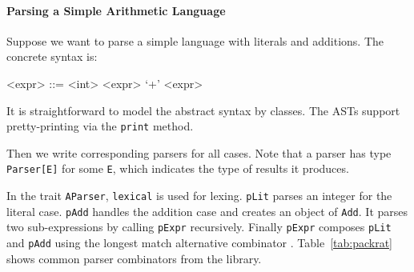 \paragraph{Parsing a Simple Arithmetic Language}
Suppose we want to parse a simple language with literals and
additions. The concrete syntax is:

\setlength{\grammarindent}{5em}
\begin{grammar}
<expr> ::= <int>
    \alt <expr> `+' <expr>
\end{grammar}

It is straightforward to model the abstract syntax by classes. The ASTs support pretty-printing via the \lstinline{print} method.


Then we write corresponding parsers for all cases.
Note that a parser has type \lstinline{Parser[E]} for some
\lstinline{E}, which indicates the type of results it produces.


In the trait \lstinline{AParser}, \lstinline{lexical} is used for lexing. \lstinline{pLit} parses an integer for the literal case.
\lstinline{pAdd} handles the addition case and creates an object of \lstinline{Add}. It parses two sub-expressions by calling \lstinline{pExpr}
recursively. Finally \lstinline{pExpr} composes \lstinline{pLit} and \lstinline{pAdd} using the longest match alternative combinator \inlinecode{|||}.
Table~\ref{tab:packrat} shows common parser combinators from the library.

